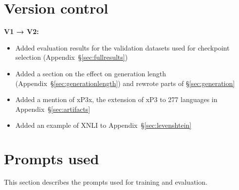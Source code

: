 \documentclass[11pt]{article}
\begin{document}
\FloatBarrier

\section{Version control}



\textbf{V1 → V2:}
\begin{itemize}
    \item Added evaluation results for the validation datasets used for checkpoint selection (Appendix~\S\ref{sec:fullresults})
    \item Added a section on the effect on generation length (Appendix~\S\ref{sec:generationlength}) and rewrote parts of \S\ref{sec:generation}
    \item Added a mention of xP3x, the extension of xP3 to 277 languages in Appendix~\S\ref{sec:artifacts}
    \item Added an example of XNLI to Appendix~\S\ref{sec:levenshtein}
\end{itemize}



\FloatBarrier

\section{Prompts used}
\label{sec:prompts}
This section describes the prompts used for training and evaluation.
\clearpage
\nocite{Artetxe:etal:2019}
\nocite{DBLP:conf/iclr/HellendoornSSMB20}
\nocite{DBLP:journals/corr/abs-2001-07676}
\nocite{N18-1101}
\nocite{austin2021program}
\nocite{cmrc2018-dataset}
\nocite{conneau2018xnli}
\nocite{goyal2021flores}
\nocite{gpt3}
\nocite{guzman2019two}
\nocite{hasan-etal-2021-xl}
\nocite{hendrycksapps2021}
\nocite{huggingface:dataset}
\nocite{kim-etal-2021-bisect}
\nocite{ladhak-wiki-2020}
\nocite{lewis2019mlqa}
\nocite{nllb2022}
\nocite{pawsx2019emnlp}
\nocite{ponti2020xcopa}
\nocite{raganato-etal-2020-xl-wic}
\nocite{roemmele2011choice}
\nocite{sanh2022multitask}
\nocite{sun2020investigating}
\nocite{tiedemann-2020-tatoeba}
\nocite{tikhonov2021heads}
\nocite{true-zero-shot}
\nocite{webson-pavlick-2021}
\nocite{xu2020clue}
\nocite{zhu2022xlcost}
 

    
\end{document}
